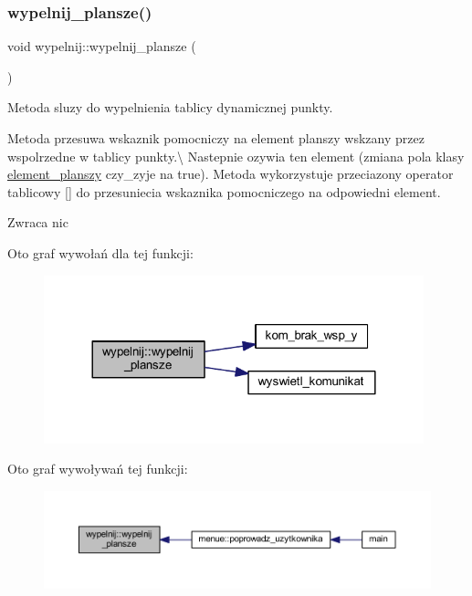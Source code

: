 \subsubsection{\texorpdfstring{wypelnij\+\_\+plansze()}{wypelnij\_plansze()}}
{\footnotesize\ttfamily void wypelnij\+::wypelnij\+\_\+plansze (\begin{DoxyParamCaption}{ }\end{DoxyParamCaption})}

Metoda sluzy do wypelnienia tablicy dynamicznej punkty.

Metoda przesuwa wskaznik pomocniczy na element planszy wskzany przez wspolrzedne w tablicy punkty.\textbackslash{} Nastepnie ozywia ten element (zmiana pola klasy \mbox{\hyperlink{classelement__planszy}{element\+\_\+planszy}} czy\+\_\+zyje na true). Metoda wykorzystuje przeciazony operator tablicowy \mbox{[}\mbox{]} do przesuniecia wskaznika pomocniczego na odpowiedni element. \begin{DoxyReturn}{Zwraca}
nic 
\end{DoxyReturn}
Oto graf wywołań dla tej funkcji\+:
\nopagebreak
\begin{figure}[H]
\begin{center}
\leavevmode
\includegraphics[width=312pt]{classwypelnij_a0bdc69f47a3ce9917e22b09c02e2ec86_cgraph}
\end{center}
\end{figure}
Oto graf wywoływań tej funkcji\+:
\nopagebreak
\begin{figure}[H]
\begin{center}
\leavevmode
\includegraphics[width=350pt]{classwypelnij_a0bdc69f47a3ce9917e22b09c02e2ec86_icgraph}
\end{center}
\end{figure}


